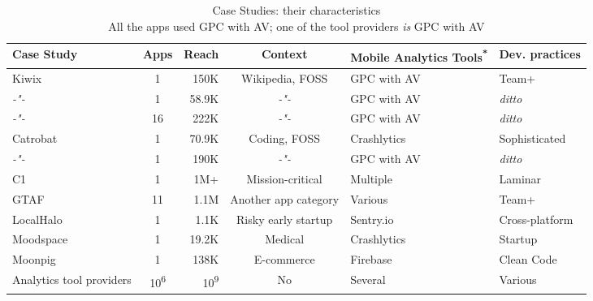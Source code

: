 \begin{table}
    \centering
    \tabcolsep=0.06cm
    \footnotesize
    \begin{tabular}{lcrcll}\toprule
    Case Study               & Apps                 & Reach & Context & Mobile Analytics Tools\textsuperscript{*}  &Dev. practices  \\
    \midrule
    Kiwix                    &                    1 &  150K & Wikipedia, FOSS            & GPC with AV &          Team+ \\ 
     \textit{-"-}            &                    1 & 58.9K & \textit{-"-}   & GPC with AV & \textit{ditto} \\
     \textit{-"-}            &                   16 &  222K & \textit{-"-}   & GPC with AV & \textit{ditto} \\
    Catrobat                 &                    1 & 70.9K & Coding, FOSS            & Crashlytics &  Sophisticated \\
     \textit{-"-}            &                    1 &  190K & \textit{-"-}   & GPC with AV & \textit{ditto} \\
    C1                       &                    1 &  1M+  & Mission-critical &    Multiple &        Laminar \\
    GTAF                     &                   11 &  1.1M & Another app category             &     Various &          Team+ \\
    LocalHalo                &                    1 &  1.1K & Risky early startup &   Sentry.io & Cross-platform \\
    Moodspace                &                    1 & 19.2K & Medical    & Crashlytics &        Startup \\
    Moonpig                  &                    1 & 138K  & E-commerce &    Firebase &     Clean Code \\
    Analytics tool providers &10\textsuperscript{6} &10\textsuperscript{9} & No &  Several &        Various \\
    \bottomrule
    \end{tabular}
    \caption[Case Studies: their characteristics]{Case Studies: their characteristics \\ {\tiny * All the apps used GPC with AV; one of the tool providers \emph{is} GPC with AV}}
    \label{tab:empirical-studies-their-characteristics}
\end{table}


